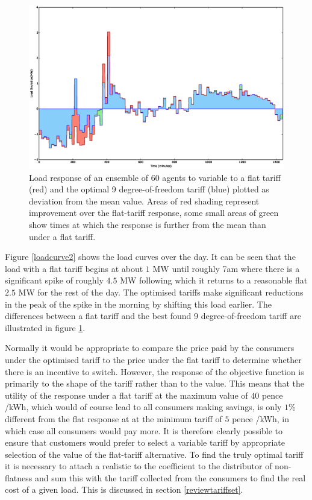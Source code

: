 \documentclass[a4paper, 10 pt, conference]{ieeeconf}  %
\begin{document}
\begin{figure}[htbp]

\centering
\includegraphics[width=\textwidth,trim =4cm 2cm 4cm 2cm,clip=True]{f5_.eps}
\caption{Load response of an ensemble of 60 agents to variable to a flat tariff (red) and the optimal 9 degree-of-freedom tariff (blue) plotted as deviation from the mean value. Areas of red shading represent improvement over the flat-tariff response, some small areas of green show times at which the response is further from the mean than under a flat tariff.}
\label{loadcurve3}
\end{figure}


Figure \ref{loadcurve2} shows the load curves over the day. It can be seen that the load with a flat tariff begins at about $1$ MW until roughly 7am where there is a significant spike of roughly $4.5$ MW following which it returns to a reasonable flat $2.5$ MW for the rest of the day. The optimised tariffs make significant reductions in the peak of the spike in the morning by shifting this load earlier. The differences between a flat tariff and the best found 9 degree-of-freedom tariff are illustrated in figure \ref{loadcurve3}.


Normally it would be appropriate to compare the price paid by the consumers under the optimised tariff to the price under the flat tariff to determine whether there is an incentive to switch. However, the response of the objective function is primarily to the shape of the tariff rather than to the value. This means that the utility of the response under a flat tariff at the maximum value of $40$ pence /kWh, which would of course lead to all consumers making savings, is only $1\%$ different from the flat response at at the minimum tariff of $5$ pence /kWh, in which case all consumers would pay more. It is therefore clearly possible to ensure that customers would prefer to select a variable tariff by appropriate selection of the value of the flat-tariff alternative. To find the truly optimal tariff it is necessary to attach a realistic to the coefficient to the distributor of non-flatness and sum this with the tariff collected from the consumers to find the real cost of a given load. This is discussed in section \ref{reviewtariffset}.
\end{document}

